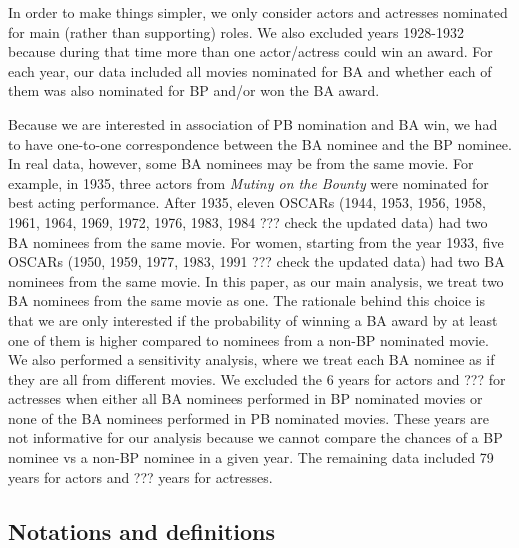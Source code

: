 \documentclass[10pt,letterpaper]{article}
\begin{document}
  
In order to make things simpler, we only consider actors and actresses nominated for main (rather than supporting) roles. We also excluded years 1928-1932 because during that time more than one actor/actress could win an award. For each year, our data included all movies nominated for BA and whether each of them was also nominated for BP and/or won the BA award.

Because we are interested in association of PB nomination and BA win, we had to have one-to-one correspondence between the BA nominee and the BP nominee. In real data, however, some BA nominees may be from the same movie. For example, in 1935, three actors from \emph{Mutiny on the Bounty} were nominated for best acting performance. After 1935, eleven OSCARs (1944, 1953, 1956, 1958, 1961, 1964, 1969, 1972, 1976, 1983, 1984 ??? check the updated data) had two BA nominees from the same movie. For women, starting from the year 1933,  five OSCARs (1950, 1959, 1977, 1983, 1991 ??? check the updated data) had two BA nominees from the same movie. In this paper, as our main analysis, we treat two BA nominees from the same movie as one. The rationale  behind this choice is that we are only interested if the probability of winning a BA award by at least one of them is higher compared to nominees from a non-BP nominated movie. We also performed a sensitivity analysis, where we treat each BA nominee as if they are all from different movies. We excluded the 6 years for actors and ??? for actresses when either all BA nominees performed in BP nominated movies or none of the BA nominees performed in PB nominated movies. These years are not informative for our analysis because we cannot compare the chances of a BP nominee vs a non-BP nominee in a given year. The remaining data included 79 years for actors and ??? years for actresses.

\subsection*{Notations and definitions}
\end{document}
